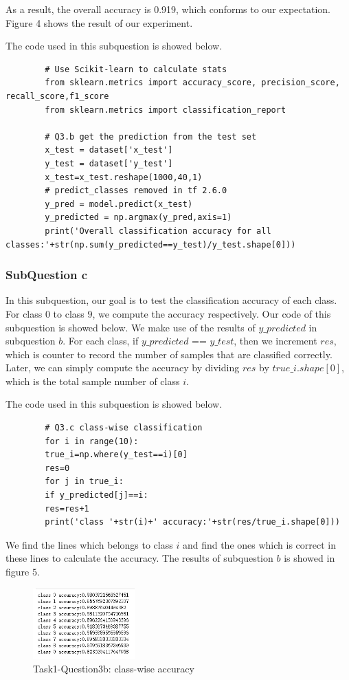 \documentclass[conference]{IEEEtran}
\begin{document}
	As a result, the overall accuracy is 0.919, which conforms to our expectation. Figure 4 shows the result of our experiment.\par
	
	
	
	The code used in this subquestion is showed below.
	
	\begin{lstlisting}
		# Use Scikit-learn to calculate stats
		from sklearn.metrics import accuracy_score, precision_score, recall_score,f1_score
		from sklearn.metrics import classification_report
		
		# Q3.b get the prediction from the test set
		x_test = dataset['x_test']
		y_test = dataset['y_test']
		x_test=x_test.reshape(1000,40,1)
		# predict_classes removed in tf 2.6.0
		y_pred = model.predict(x_test)
		y_predicted = np.argmax(y_pred,axis=1)
		print('Overall classification accuracy for all classes:'+str(np.sum(y_predicted==y_test)/y_test.shape[0]))
	\end{lstlisting}
	
	
	
	\subsubsection{SubQuestion c}
	In this subquestion, our goal is to test the classification accuracy of each class. For class $0$ to class $9$, we compute the accuracy respectively. Our code of this subquestion is showed below. We make use of the results of $y\_predicted$ in subquestion $b$. For each class, if $y\_predicted$ == $y\_test$, then we increment $res$, which is counter to record the number of samples that are classified correctly. Later, we can simply compute the accuracy by dividing $res$ by $true\_i.shape[0]$, which is the total sample number of class $i$.\par
	The code used in this subquestion is showed below.
	\begin{lstlisting}
		# Q3.c class-wise classification
		for i in range(10):
		true_i=np.where(y_test==i)[0]
		res=0
		for j in true_i:
		if y_predicted[j]==i:
		res=res+1
		print('class '+str(i)+' accuracy:'+str(res/true_i.shape[0]))
	\end{lstlisting} \par 
	We find the lines which belongs to class $i$ and find the ones which is correct in these lines to calculate the accuracy. The results of subquestion $b$ is showed in figure $5$.\par
	\begin{figure}[h] 
		\centering
		\includegraphics[width=0.35\textwidth]{T1Q3c.png}
		\caption{Task1-Question3b: class-wise accuracy} 
		\label{Fig.t1q3c} 
	\end{figure}
	
\end{document}
